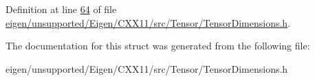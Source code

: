 Definition at line \hyperlink{eigen_2unsupported_2_eigen_2_c_x_x11_2src_2_tensor_2_tensor_dimensions_8h_source_l00064}{64} of file \hyperlink{eigen_2unsupported_2_eigen_2_c_x_x11_2src_2_tensor_2_tensor_dimensions_8h_source}{eigen/unsupported/\+Eigen/\+C\+X\+X11/src/\+Tensor/\+Tensor\+Dimensions.\+h}.



The documentation for this struct was generated from the following file\+:\begin{DoxyCompactItemize}
\item 
eigen/unsupported/\+Eigen/\+C\+X\+X11/src/\+Tensor/\+Tensor\+Dimensions.\+h\end{DoxyCompactItemize}
